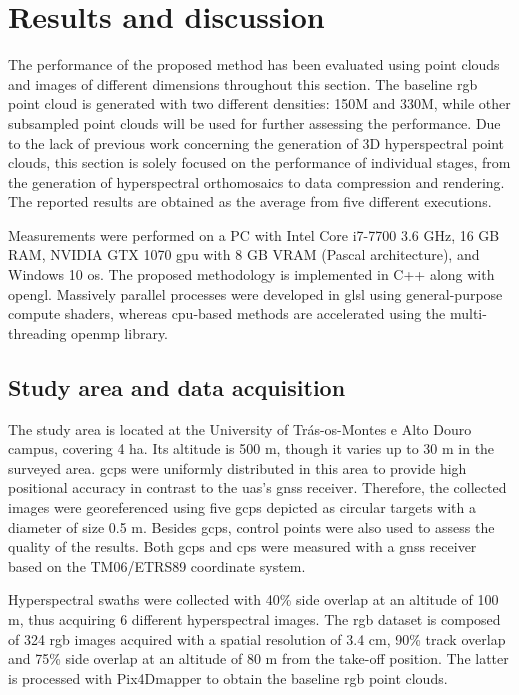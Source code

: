 \section{Results and discussion}

The performance of the proposed method has been evaluated using point clouds and images of different dimensions throughout this section. The baseline \acrshort{rgb} point cloud is generated with two different densities: 150M and 330M, while other subsampled point clouds will be used for further assessing the performance. Due to the lack of previous work concerning the generation of 3D hyperspectral point clouds, this section is solely focused on the performance of individual stages, from the generation of hyperspectral orthomosaics to data compression and rendering. The reported results are obtained as the average from five different executions.

Measurements were performed on a PC with Intel Core i7-7700 3.6 GHz, 16 GB RAM, NVIDIA GTX 1070 \acrshort{gpu} with 8 GB VRAM (Pascal architecture), and Windows 10 \acrshort{os}. The proposed methodology is implemented in C++ along with \acrshort{opengl}. Massively parallel processes were developed in \acrshort{glsl} using general-purpose compute shaders, whereas \acrshort{cpu}-based methods are accelerated using the multi-threading \acrshort{openmp} library.

\subsection{Study area and data acquisition}

The study area is located at the University of Trás-os-Montes e Alto Douro campus, covering 4 \si{\hectare}. Its altitude is 500 \si{\meter}, though it varies up to 30 \si{\meter} in the surveyed area. \acrshort{gcp}s were uniformly distributed in this area to provide high positional accuracy in contrast to the \acrshort{uas}’s \acrshort{gnss} receiver. Therefore, the collected images were georeferenced using five \acrshort{gcp}s depicted as circular targets with a diameter of size 0.5 \si{\meter}. Besides \acrshort{gcp}s, control points were also used to assess the quality of the results. Both \acrshort{gcp}s and \acrshort{cp}s were measured with a \acrshort{gnss} receiver based on the TM06/ETRS89 coordinate system.

Hyperspectral swaths were collected with 40\% side overlap at an altitude of 100 \si{\meter}, thus acquiring 6 different hyperspectral images. The \acrshort{rgb} dataset is composed of 324 \acrshort{rgb} images acquired with a spatial resolution of 3.4 \si{\centi\meter}, 90\% track overlap and 75\% side overlap at an altitude of 80 \si{\meter} from the take-off position. The latter is processed with Pix4Dmapper to obtain the baseline \acrshort{rgb} point clouds. 

